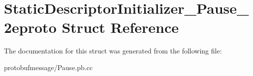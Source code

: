 \hypertarget{struct_static_descriptor_initializer___pause__2eproto}{\section{Static\-Descriptor\-Initializer\-\_\-\-Pause\-\_\-2eproto Struct Reference}
\label{struct_static_descriptor_initializer___pause__2eproto}
}


The documentation for this struct was generated from the following file\-:\begin{DoxyCompactItemize}
\item 
protobufmessage/Pause.\-pb.\-cc\end{DoxyCompactItemize}
